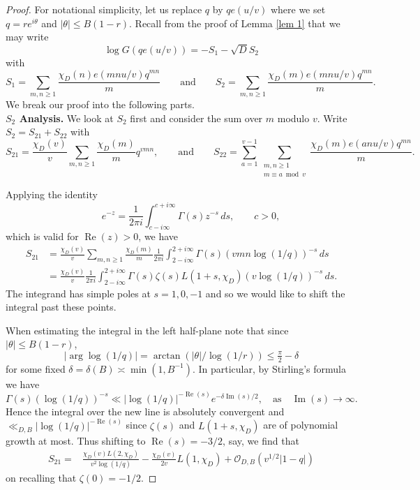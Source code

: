 \documentclass[11pt]{amsart}
\numberwithin{equation}{section}
\theoremstyle{remark}
\begin{document}
\begin{proof}
For notational simplicity, let us replace $q$ by $qe(u/v)$ where we set $q=re^{i\theta}$ and $|\theta|\leq B(1-r)$. Recall from the proof of Lemma \ref{lem 1} that we may write
\begin{equation}\label{log F twist}
\log G(qe(u/v))=-S_1-\sqrt{D}S_2
\end{equation}
with 
\[
S_1
=
\sum_{m,n\geq 1}\frac{\chi_D(n)e(mnu/v)q^{mn}}{m}
\qquad \textrm{and} \qquad
S_2
=
\sum_{m,n\geq 1}\frac{\chi_D(m)e(mnu/v)q^{mn}}{m}.
\]
We break our proof into the following parts.\\

 \noindent \textbf{$S_2$ Analysis.} We look at $S_2$ first and consider the sum over $m$ modulo $v$. Write $S_2=S_{21}+S_{22}$ with 
 \[
 S_{21}
 =
 \frac{\chi_D(v)}{v}\sum_{m,n\geq 1}\frac{\chi_D(m)}{m}q^{vmn},
 \qquad \textrm{and} \qquad
 S_{22}
 =
 \sum_{a=1}^{v-1}\sum_{\substack{m,n\geq 1 \\ m\equiv a \bmod v}}
 \frac{\chi_D(m)e(anu/v)q^{mn}}{m}.
 \]

Applying the identity
\begin{equation}\label{mellin}
\qquad e^{-z}=\frac{1}{2\pi i }\int_{c-i\infty}^{c+i\infty}\Gamma(s)z^{-s}\, ds, \qquad c>0,
\end{equation}
which is valid for $\operatorname{Re}(z)>0$, we have
\begin{align*}
S_{21} &=
\frac{\chi_D(v)}{v}
\sum_{m,n\geq 1}\frac{\chi_D(m)}{m}
\frac{1}{2\pi i }\int_{2-i\infty}^{2+i\infty}\Gamma(s)(vmn\log(1/q))^{-s} \, ds
\\
&=
\frac{\chi_D(v)}{v}
\frac{1}{2\pi i }\int_{2-i\infty}^{2+i\infty}
\Gamma(s)\zeta(s)L(1+s,\chi_D)(v\log(1/q))^{-s}\, ds.
\end{align*}
The integrand has simple poles at $s=1,0,-1$ and so we would like to shift the integral past these points. 

When estimating the integral in the left half-plane note that since $|\theta|\leq B(1-r)$, 
\[
|\arg \log(1/q)|=\arctan(|\theta|/\log(1/r))\leq \tfrac{\pi}{2}-\delta
\] 
for some fixed $\delta=\delta(B)\asymp \min (1,B^{-1})$. In particular, by Stirling's formula we have 
\[
\Gamma(s)(\log(1/q))^{-s}\ll |\log(1/q)|^{-\operatorname{Re}(s)} e^{-\delta \operatorname{Im}(s)/2}, \quad \textrm{as} \quad \operatorname{Im}(s)\to\infty.
\]
Hence the integral over the new line is absolutely convergent and $\ll_{D,B} |\log(1/q)|^{-\operatorname{Re}(s)}$ since $\zeta(s)$ and $L(1+s,\chi_D)$  are of polynomial growth at most.
Thus shifting to $\operatorname{Re}(s)=-3/2$, say, we find that 
\begin{align*}
S_{21}
= &
\frac{\chi_D(v)L(2,\chi_D)}{v^2\log(1/q)}
-\frac{\chi_D(v)}{2v}
L(1,\chi_D)
+\mathcal{O}_{D,B}(v^{1/2}|1-q|)
\end{align*}
on recalling that $\zeta(0)=-1/2$. 



\end{proof}
\end{document}
